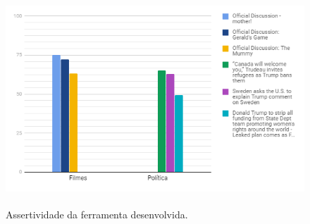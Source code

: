 \begin{figure}[!htbp]
\centering
\includegraphics[height=300px]{imagens/grafico1.png}
\caption{Assertividade da ferramenta desenvolvida.}
\label{fig:ass}
\end{figure}
